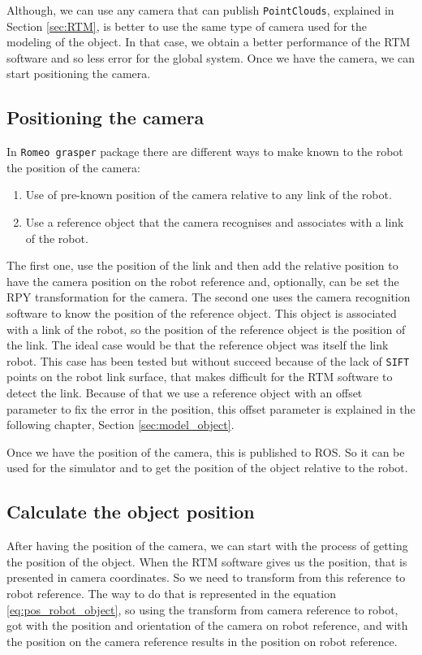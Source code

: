 \documentclass[12pt,a4paper,final,twoside,openright]{report}
\begin{document}
Although, we can use any camera that can publish \texttt{PointClouds}, explained in Section \ref{sec:RTM}, is better to use the same type of camera used for the modeling of the object. In that case, we obtain a better performance of the RTM software and so less error for the global system. Once we have the camera, we can start positioning the camera.

\subsection{Positioning the camera}
\label{sec:positioning_camera}

In \texttt{Romeo grasper} package there are different ways to make known to the robot the position of the camera:
\begin{enumerate}
\item Use of pre-known position of the camera relative to any link of the robot.
\item Use a reference object that the camera recognises and associates with a link of the robot.
\end{enumerate}

The first one, use the position of the link and then add the relative position to have the camera position on the robot reference and, optionally, can be set the RPY transformation for the camera. The second one uses the camera recognition software to know the position of the reference object. This object is associated with a link of the robot, so the position of the reference object is the position of the link. The ideal case would be that the reference object was itself the link robot. This case has been tested but without succeed because of the lack of \texttt{SIFT} points on the robot link surface, that makes difficult for the RTM software to detect the link. Because of that we use a reference object with an offset parameter to fix the error in the position, this offset parameter is explained in the following chapter, Section \ref{sec:model_object}.

Once we have the position of the camera, this is published to ROS. So it can be used for the simulator and to get the position of the object relative to the robot.

\subsection{Calculate the object position}
\label{sec:design_object_position}

After having the position of the camera, we can start with the process of getting the position of the object. When the RTM software gives us the position, that is presented in camera coordinates. So we need to transform from this reference to robot reference. The way to do that is represented in the equation \eqref{eq:pos_robot_object}, so using the transform from camera reference to robot, got with the position and orientation of the camera on robot reference, and with the position on the camera reference results in the position on robot reference.
\end{document}
